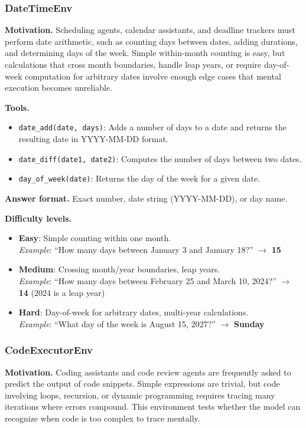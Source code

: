 \subsubsection{DateTimeEnv}

\textbf{Motivation.}
Scheduling agents, calendar assistants, and deadline trackers must perform date arithmetic, such as counting days between dates, adding durations, and determining days of the week. Simple within-month counting is easy, but calculations that cross month boundaries, handle leap years, or require day-of-week computation for arbitrary dates involve enough edge cases that mental execution becomes unreliable.

\textbf{Tools.}
\begin{itemize}
    \item \texttt{date\_add(date, days)}: Adds a number of days to a date and returns the resulting date in YYYY-MM-DD format.
    \item \texttt{date\_diff(date1, date2)}: Computes the number of days between two dates.
    \item \texttt{day\_of\_week(date)}: Returns the day of the week for a given date.
\end{itemize}

\textbf{Answer format.} Exact number, date string (YYYY-MM-DD), or day name.

\textbf{Difficulty levels.}
\begin{itemize}
    \item \textbf{Easy}: Simple counting within one month.\\
    \emph{Example}: ``How many days between January 3 and January 18?'' $\to$ \textbf{15}
    \item \textbf{Medium}: Crossing month/year boundaries, leap years.\\
    \emph{Example}: ``How many days between February 25 and March 10, 2024?'' $\to$ \textbf{14} (2024 is a leap year)
    \item \textbf{Hard}: Day-of-week for arbitrary dates, multi-year calculations.\\
    \emph{Example}: ``What day of the week is August 15, 2027?'' $\to$ \textbf{Sunday}
\end{itemize}

\subsubsection{CodeExecutorEnv}

\textbf{Motivation.}
Coding assistants and code review agents are frequently asked to predict the output of code snippets. Simple expressions are trivial, but code involving loops, recursion, or dynamic programming requires tracing many iterations where errors compound. This environment tests whether the model can recognize when code is too complex to trace mentally.

